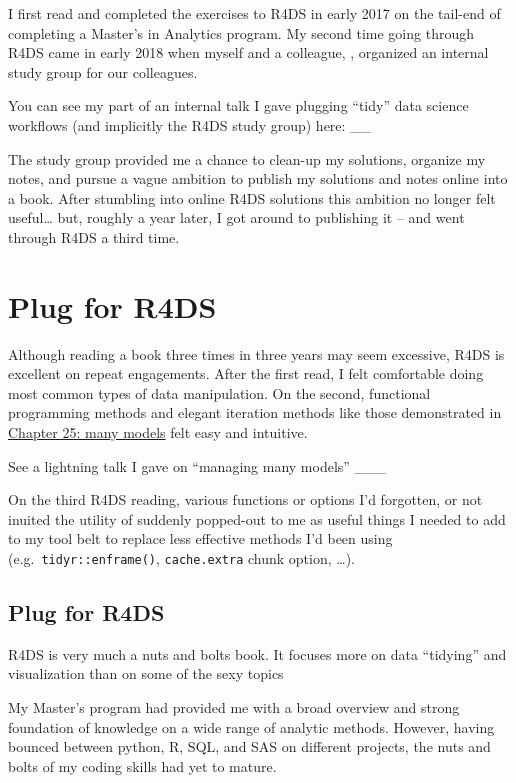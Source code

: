 \documentclass[]{book}
\theoremstyle{definition}
\theoremstyle{definition}
\theoremstyle{definition}
\theoremstyle{remark}
\begin{document}
I first read and completed the exercises to R4DS in early 2017 on the
tail-end of completing a Master's in Analytics program. My second time
going through R4DS came in early 2018 when myself and a colleague,
\citet{StephenKimel}, organized an internal study group for our
colleagues.

You can see my part of an internal talk I gave plugging ``tidy'' data
science workflows (and implicitly the R4DS study group) here: \_\_

The study group provided me a chance to clean-up my solutions, organize
my notes, and pursue a vague ambition to publish my solutions and notes
online into a book. After stumbling into \citet{Jrnold} online R4DS
solutions this ambition no longer felt useful\ldots{} but, roughly a
year later, I got around to publishing it -- and went through R4DS a
third time.

\hypertarget{plug-for-r4ds}{%
\chapter{Plug for R4DS}\label{plug-for-r4ds}}

Although reading a book three times in three years may seem excessive,
R4DS is excellent on repeat engagements. After the first read, I felt
comfortable doing most common types of data manipulation. On the second,
functional programming methods and elegant iteration methods like those
demonstrated in \href{https://r4ds.had.co.nz/many-models.html}{Chapter
25: many models} felt easy and intuitive.

See a lightning talk I gave on ``managing many models'' \_\_\_

On the third R4DS reading, various functions or options I'd forgotten,
or not inuited the utility of suddenly popped-out to me as useful things
I needed to add to my tool belt to replace less effective methods I'd
been using (e.g.~\texttt{tidyr::enframe()}, \texttt{cache.extra} chunk
option, \ldots{}).

\hypertarget{plug-for-r4ds-1}{%
\section{Plug for R4DS}\label{plug-for-r4ds-1}}

R4DS is very much a nuts and bolts book. It focuses more on data
``tidying'' and visualization than on some of the sexy topics

My Master's program had provided me with a broad overview and strong
foundation of knowledge on a wide range of analytic methods. However,
having bounced between python, R, SQL, and SAS on different projects,
the nuts and bolts of my coding skills had yet to mature.
\end{document}
